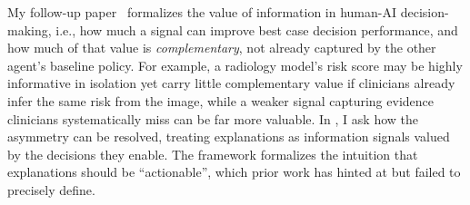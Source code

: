 My follow-up paper~\citep{guo2026value} formalizes the value of information in human-AI decision-making, i.e., how much a signal can improve best case decision performance, and how much of that value is \emph{complementary}, not already captured by the other agent's baseline policy.
For example, a radiology model's risk score may be highly informative in isolation yet carry little complementary value if clinicians already infer the same risk from the image, while a weaker signal capturing evidence clinicians systematically miss can be far more valuable.
In \citep{guo2026explanations}, I ask how the asymmetry can be resolved, treating explanations as information signals valued by the decisions they enable.
The framework formalizes the intuition that explanations should be ``actionable'', which prior work has hinted at but failed to precisely define.




